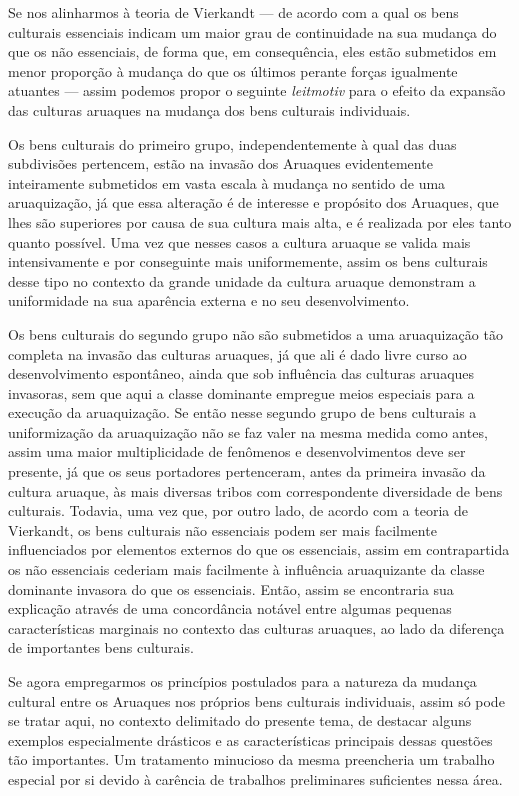 Se nos alinharmos à teoria de Vierkandt --- de acordo com a qual os bens
culturais essenciais indicam um maior grau de continuidade na sua
mudança do que os não essenciais, de forma que, em consequência, eles
estão submetidos em menor proporção à mudança do que os últimos perante
forças igualmente atuantes --- assim podemos propor o seguinte
\textit{leitmotiv} para o efeito da expansão das culturas aruaques na
mudança dos bens culturais individuais.

Os bens culturais do primeiro grupo, independentemente à qual das duas
subdivisões pertencem, estão na invasão dos Aruaques evidentemente
inteiramente submetidos em vasta escala à mudança no sentido de uma
aruaquização, já que essa alteração é de interesse e propósito dos
Aruaques, que lhes são superiores por causa de sua cultura mais alta, e
é realizada por eles tanto quanto possível. Uma vez que nesses casos a
cultura aruaque se valida mais intensivamente e por conseguinte mais
uniformemente, assim os bens culturais desse tipo no contexto da grande
unidade da cultura aruaque demonstram a uniformidade na sua aparência
externa e no seu desenvolvimento.

Os bens culturais do segundo grupo não são submetidos a uma aruaquização
tão completa na invasão das culturas aruaques, já que ali é dado livre
curso ao desenvolvimento espontâneo, ainda que sob influência das
culturas aruaques invasoras, sem que aqui a classe dominante empregue
meios especiais para a execução da aruaquização. Se então nesse segundo
grupo de bens culturais a uniformização da aruaquização não se faz
valer na mesma medida como antes, assim uma maior multiplicidade de
fenômenos e desenvolvimentos deve ser presente, já que os seus
portadores pertenceram, antes da primeira invasão da cultura aruaque, às
mais diversas tribos com correspondente diversidade de bens culturais.
Todavia, uma vez que, por outro lado, de acordo com a teoria de
Vierkandt, os bens culturais não essenciais podem ser mais facilmente
influenciados por elementos externos do que os essenciais, assim em
contrapartida os não essenciais cederiam mais facilmente à influência
aruaquizante da classe dominante invasora do que os essenciais. Então,
assim se encontraria sua explicação através de uma concordância notável
entre algumas pequenas características marginais no contexto das
culturas aruaques, ao lado da diferença de importantes bens culturais.

Se agora empregarmos os princípios postulados para a natureza da
mudança cultural entre os Aruaques nos próprios bens culturais
individuais, assim só pode se tratar aqui, no contexto delimitado do
presente tema, de destacar alguns exemplos especialmente drásticos e as
características principais dessas questões tão importantes. Um
tratamento minucioso da mesma preencheria um trabalho especial por si
devido à carência de trabalhos preliminares suficientes nessa área.


